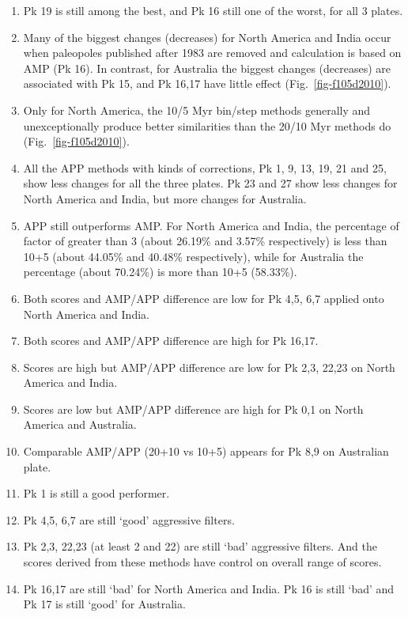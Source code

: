\begin{enumerate}
  \item Pk 19 is still among the best, and Pk 16 still one of the worst, for
		all 3 plates.
  \item Many of the biggest changes (decreases) for North America and India
		occur when paleopoles published after 1983 are removed and calculation
		is based on AMP (Pk 16). In contrast, for Australia the biggest
		changes (decreases) are associated with Pk 15, and Pk 16,17
		have little effect (Fig.~\ref{fig-f105d2010}).
  \item Only for North America, the 10/5 Myr bin/step methods generally and
		unexceptionally produce better similarities than the 20/10 Myr methods
		do (Fig.~\ref{fig-f105d2010}).
  \item All the APP methods with kinds of corrections, Pk 1, 9, 13, 19, 21 and
		25, show less changes for all the three plates. Pk 23 and 27 show less
		changes for North America and India, but more changes for Australia.
  \item APP still outperforms AMP\@. For North America and India, the percentage
		of factor of greater than 3 (about 26.19\% and 3.57\% respectively) is
		less than 10+5 (about 44.05\% and 40.48\% respectively), while for
		Australia the percentage (about 70.24\%) is more than 10+5 (58.33\%).
  \item Both scores and AMP/APP difference are low for Pk 4,5, 6,7 applied
		onto North America and India.
  \item Both scores and AMP/APP difference are high for Pk 16,17.
  \item Scores are high but AMP/APP difference are low for Pk 2,3, 22,23
		on North America and India.
  \item Scores are low but AMP/APP difference are high for Pk 0,1 on North
		America and Australia.
  \item Comparable AMP/APP (20+10 vs 10+5) appears for Pk 8,9 on Australian plate.
  \item Pk 1 is still a good performer.
  \item Pk 4,5, 6,7 are still `good' aggressive filters.
  \item Pk 2,3, 22,23 (at least 2 and 22) are still `bad' aggressive
		filters. And the scores derived from these methods have control on
		overall range of scores.
  \item Pk 16,17 are still `bad' for North America and India. Pk 16 is
		still `bad' and Pk 17 is still `good' for Australia.
\end{enumerate}

